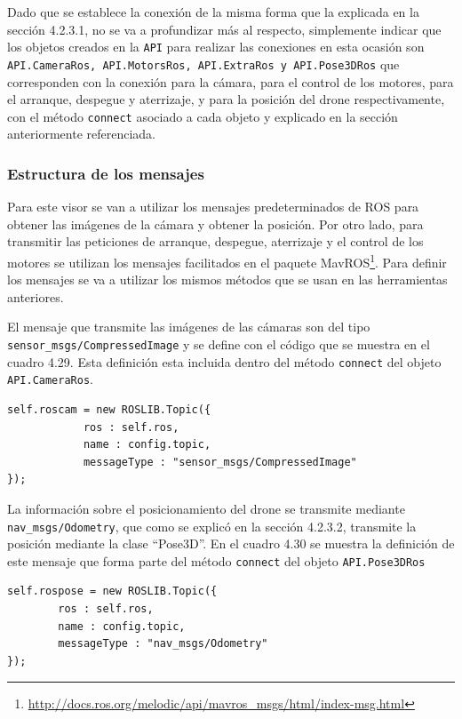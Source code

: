 Dado que se establece la conexión de la misma forma que la explicada en la sección 4.2.3.1, no se va a profundizar más al respecto, simplemente indicar que los objetos creados en la \texttt{API} para realizar las conexiones en esta ocasión son \texttt{API.CameraRos, API.MotorsRos, API.ExtraRos y API.Pose3DRos} que corresponden con la conexión para la cámara, para el control de los motores, para el arranque, despegue y aterrizaje, y para la posición del drone respectivamente, con el método \texttt{connect} asociado a cada objeto y explicado en la sección anteriormente referenciada.

\subsubsection{Estructura de los mensajes}

Para este visor se van a utilizar los mensajes predeterminados de ROS para obtener las imágenes de la cámara y obtener la posición. Por otro lado, para transmitir las peticiones de arranque, despegue, aterrizaje y el control de los motores se utilizan los mensajes facilitados en el paquete MavROS\footnote{\url{http://docs.ros.org/melodic/api/mavros_msgs/html/index-msg.html}}. Para definir los mensajes se va a utilizar los mismos métodos que se usan en las herramientas anteriores.

El mensaje que transmite las imágenes de las cámaras son del tipo \texttt{sensor\_msgs/CompressedImage} y se define con el código que se muestra en el cuadro 4.29. Esta definición esta incluida dentro del método \texttt{connect} del objeto \texttt{API.CameraRos}.

\begin{lstlisting}[caption= Definición del mensaje para la información de las cámaras, label=cod.mensajecamdrone]
self.roscam = new ROSLIB.Topic({
            ros : self.ros,
            name : config.topic,
            messageType : "sensor_msgs/CompressedImage"
});
\end{lstlisting}

La información sobre el posicionamiento del drone se transmite mediante \texttt{nav\_msgs/Odometry}, que como se explicó en la sección 4.2.3.2, transmite la posición mediante la clase ``Pose3D''. En el cuadro 4.30 se muestra la definición de este mensaje que forma parte del método \texttt{connect} del objeto \texttt{API.Pose3DRos}

\begin{lstlisting}[caption= Definición del mensaje para obtener el posicionamiento del drone, label=cod.mensajeposedrone]
self.rospose = new ROSLIB.Topic({
		ros : self.ros,
		name : config.topic,
		messageType : "nav_msgs/Odometry"
});
\end{lstlisting}

